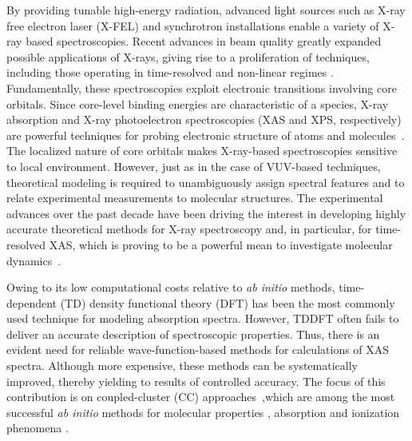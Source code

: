 \documentclass[journal=jctcce,manuscript=article]{achemso}
\begin{document}
By providing tunable high-energy radiation, advanced light sources
such as X-ray free electron laser (X-FEL) and synchrotron installations enable a variety of X-ray based spectroscopies\cite{Lamberti:XRay:2016,Mobilio:XRay:2014,Bergmann:FEL:17}.
Recent advances in beam quality greatly expanded possible applications of X-rays, giving rise to a proliferation of techniques, including those operating in time-resolved and non-linear
regimes \cite{Mobilio:XRay:2014,Lamberti:XRay:2016,Bergmann:FEL:17,Atto:Rev:17,Norman:ChemRev:18}.  
Fundamentally, these spectroscopies exploit electronic transitions involving core orbitals. 
Since core-level binding energies are characteristic of a species, X-ray absorption and
X-ray photoelectron spectroscopies (XAS and XPS, respectively) 
are powerful techniques for probing electronic structure of atoms and molecules~\cite{Stohr1992}.
The localized nature of core orbitals makes X-ray-based spectroscopies sensitive to local environment.  
However, just as in the case of VUV-based techniques\cite{Ahmed:ARPC:16},
theoretical modeling is required to unambiguously assign spectral features and to
relate experimental measurements to molecular structures. 
The experimental advances over the past decade have been driving the interest in developing highly accurate theoretical methods for X-ray spectroscopy and, in particular, for time-resolved XAS, which is proving to be a powerful mean to investigate molecular dynamics~\cite{Norman:ChemRev:18,naturecomm,Milne2014,kraus2018}.

Owing to its low computational costs relative to \textit{ab initio} methods, time-dependent (TD) density functional theory (DFT) has been the most commonly used technique 
for modeling absorption spectra\cite{Besley:CoreDFTPersp:10}.
However, TDDFT often fails to deliver an accurate description of spectroscopic properties. Thus, there is an evident need for reliable wave-function-based methods for calculations of XAS spectra. Although more expensive, these methods can be systematically improved, thereby yielding to
results of controlled accuracy\cite{OlsenText}. The focus of this contribution is on coupled-cluster (CC)
approaches~\cite{koch1990,Stanton:93:EOMCC,Christiansen_IJQC,krylov_eom_2008,WF_Properties_Review,CC_EOMCC_Bartlett,Christiansen2006,Christiansen:EOMRev:11},which are among the most successful \textit{ab initio} methods for molecular properties 
{\color{red}{and electronic spectra in the UV-vis region}}, 
{\color{red}{to describe}}  absorption and ionization phenomena {\color{red}{in the X-ray spectral region}}\cite{coriani2012jctc,Peng2015,coriani2012pra,coriani2015jcp,naturecomm}.
\end{document}
